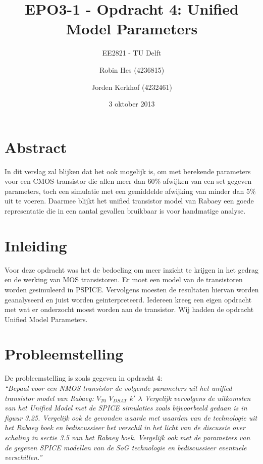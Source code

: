\documentclass{scrartcl}
\author{Robin Hes (4236815) \and Jorden Kerkhof (4232461)}
\title{EPO3-1 - Opdracht 4: Unified Model Parameters}
\subtitle{EE2821 - TU Delft}
\date{3 oktober 2013}
\begin{document}
\maketitle

\section*{Abstract}
In dit verslag zal blijken dat het ook mogelijk is, om met berekende parameters voor een CMOS-transistor die allen meer dan 60\% afwijken van een set gegeven parameters, toch een simulatie met een gemiddelde afwijking van minder dan 5\% uit te voeren. Daarmee blijkt het unified transistor model van Rabaey een goede representatie die in een aantal gevallen bruikbaar is voor handmatige analyse.

\newpage
\label{sec:ump-abstr}

\tableofcontents

\section{Inleiding}
\label{sec:ump-inl}
Voor deze opdracht was het de bedoeling om meer inzicht te krijgen in het gedrag en de werking van MOS transistoren. Er moet een model van de transistoren worden gesimuleerd in PSPICE. Vervolgens moesten de resultaten hiervan worden geanalyseerd en juist worden geinterpreteerd. Iedereen kreeg een eigen opdracht met wat er onderzocht moest worden aan de transistor. Wij hadden de opdracht Unified Model Parameters.

\newpage
\section{Probleemstelling}
\label{sec:ump-prob}
De probleemstelling is zoals gegeven in opdracht 4: \\
\textit{
``Bepaal voor een NMOS transistor de volgende parameters uit het unified transistor model van Rabaey:
$V_{T0}$ $V_{DSAT}$ $k'$ $\lambda$
Vergelijk vervolgens de uitkomsten van het Unified Model met de SPICE simulaties zoals bijvoorbeeld
gedaan is in figuur 3.25. Vergelijk ook de gevonden waarde met waarden van de technologie uit het Rabaey
boek en bediscussieer het verschil in het licht van de discussie over schaling in sectie 3.5 van het Rabaey
boek. Vergelijk ook met de parameters van de gegeven SPICE modellen van de SoG technologie en bediscussieer
eventuele verschillen.''
}
\cite[4]{opdracht-4}
\end{document}
